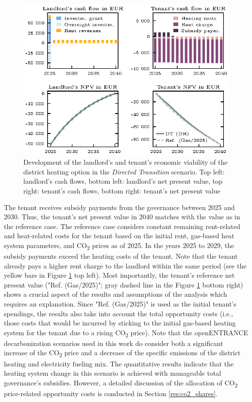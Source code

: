 \begin{figure}[h]
	\centering
	\includegraphics[width=0.9\linewidth]{figures/4_Results/fig_DT_DH/detail.eps}
	\caption{Development of the landlord's and tenant's economic viability of the district heating option in the \textit{Directed Transition} scenario. Top left: landlord's cash flows, bottom left: landlord's net present value, top right: tenant's cash flows, bottom right: tenant's net present value}
	\label{fig:dt+dh}
\end{figure}

 The tenant receives subsidy payments from the governance between 2025 and 2030. Thus, the tenant's net present value in $2040$ matches with the value as in the reference case. The reference case considers constant remaining rent-related and heat-related costs for the tenant based on the initial rent, gas-based heat system parameters, and CO\textsubscript{2} prices as of 2025. In the years 2025 to 2029, the subsidy payments exceed the heating costs of the tenant. Note that the tenant already pays a higher rent charge to the landlord within the same period (see the yellow bars in Figure \ref{fig:dt+dh} top left). Most importantly, the tenant's reference net present value ("Ref. (Gas/2025)"; gray dashed line in the Figure \ref{fig:dt+dh} bottom right) shows a crucial aspect of the results and assumptions of the analysis which requires an explanation. Since "Ref. (Gas/2025)" is used as the initial tenant's spendings, the results also take into account the total opportunity costs (i.e., those costs that would be incurred by sticking to the initial gas-based heating system for the tenant due to a rising CO\textsubscript{2} price). Note that the openENTRANCE decarbonization scenarios used in this work do consider both a significant increase of the CO\textsubscript{2} price and a decrease of the specific emissions of the district heating and electricity fueling mix. The quantitative results indicate that the heating system change in this scenario is achieved with manageable total governance's subsidies. However, a detailed discussion of the allocation of CO\textsubscript{2} price-related opportunity costs is conducted in Section \ref{res:co2_shares}.

